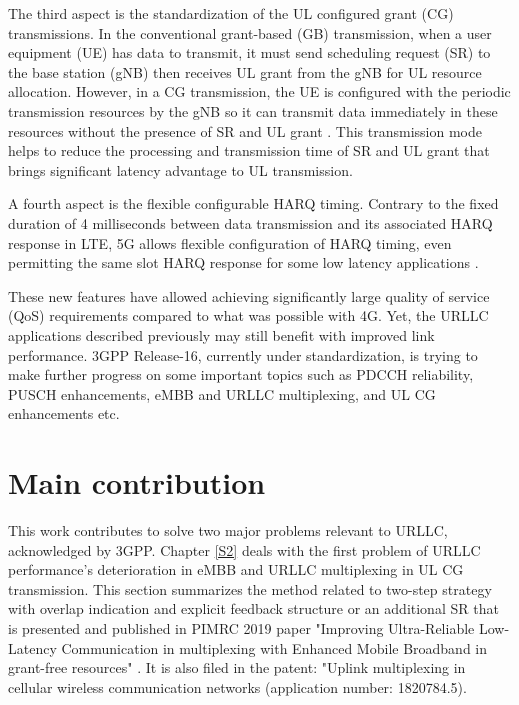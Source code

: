 \documentclass{report}
\begin{document}
The third aspect is the standardization of the UL configured grant (CG) transmissions. In the conventional grant-based (GB) transmission, when a user equipment (UE) has data to transmit, it must send scheduling request (SR) to the base station (gNB) then receives UL grant from the gNB for UL resource allocation. However, in a CG transmission, the UE is configured with the periodic transmission resources by the gNB so it can transmit data immediately in these resources without the presence of SR and UL grant \cite{ad3}. This transmission mode helps to reduce the processing and transmission time of SR and UL grant that brings significant latency advantage to UL transmission.

A fourth aspect is the flexible configurable HARQ timing. Contrary to the fixed duration of 4 milliseconds between data transmission and its associated HARQ response in LTE, 5G allows flexible configuration of HARQ timing, even permitting the same slot HARQ response for some low latency applications \cite{ad23}.

These new features have allowed achieving significantly large quality of service (QoS) requirements compared to what was possible with 4G. Yet, the URLLC applications described previously may still benefit with improved link performance. 3GPP Release-16, currently under standardization, is trying to make further progress on some important topics such as PDCCH reliability, PUSCH enhancements, eMBB and URLLC multiplexing, and UL CG enhancements etc. 

\section{Main contribution}

This work contributes to solve two major problems relevant to URLLC, acknowledged by 3GPP. Chapter \ref{S2} deals with the first problem of URLLC performance's deterioration in eMBB and URLLC multiplexing in UL CG transmission. This section summarizes the method related to two-step strategy with overlap indication and explicit feedback structure or an additional SR that is presented and published in  PIMRC 2019 paper "Improving Ultra-Reliable Low-Latency Communication in multiplexing with Enhanced Mobile Broadband in grant-free resources" \cite{ad99}. It is also filed in the patent: "Uplink multiplexing in cellular wireless communication networks (application number: 1820784.5). 
\end{document}
